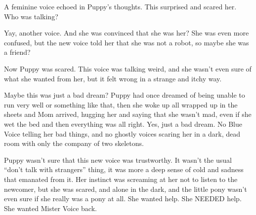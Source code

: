 
A feminine voice echoed in Puppy's thoughts. This surprised and scared her. Who was talking?


Yay, another voice. And she was convinced that she was her? She was even more confused, but the new voice told her that she was not a robot, so maybe she was a friend?


Now Puppy was scared. This voice was talking weird, and she wasn't even sure of what she wanted from her, but it felt wrong in a strange and itchy way.


Maybe this was just a bad dream? Puppy had once dreamed of being unable to run very well or something like that, then she woke up all wrapped up in the sheets and Mom arrived, hugging her and saying that she wasn't mad, even if she wet the bed and then everything was all right. Yes, just a bad dream. No Blue Voice telling her bad things, and no ghostly voices scaring her in a dark, dead room with only the company of two skeletons.


Puppy wasn't sure that this new voice was trustworthy. It wasn't the usual ``don't talk with strangers'' thing, it was more a deep sense of cold and sadness that emanated from it. Her instinct was screaming at her not to listen to the newcomer, but she was scared, and alone in the dark, and the little pony wasn't even sure if she really was a pony at all. She wanted help. She NEEDED help. She wanted Mister Voice back.


